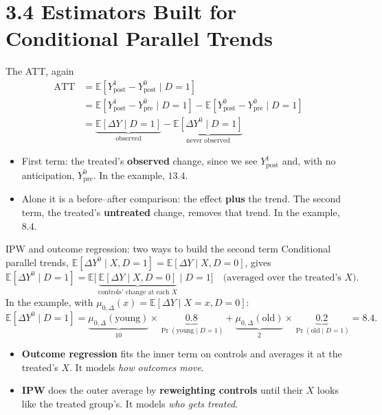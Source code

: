 \documentclass[
  11pt,
  ignorenonframetext,
  aspectratio=169,
]{beamer}
\providecommand{\tightlist}{%
  \setlength{\itemsep}{0pt}\setlength{\parskip}{0pt}}
\begin{document}
\section{3.4 Estimators Built for Conditional Parallel
Trends}\label{estimators-built-for-conditional-parallel-trends}

\begin{frame}{The ATT, again}
\protect{}\label{the-att-again}
\[
\begin{aligned}
\text{ATT} &= \mathbb{E}[Y^1_{\text{post}} - Y^0_{\text{post}} \mid D=1] \\
&= \mathbb{E}[Y^1_{\text{post}} - Y^0_{\text{pre}} \mid D=1] - \mathbb{E}[Y^0_{\text{post}} - Y^0_{\text{pre}} \mid D=1] \\
&= \underbrace{\mathbb{E}[\Delta Y \mid D=1]}_{\text{observed}} - \underbrace{\mathbb{E}[\Delta Y^0 \mid D=1]}_{\text{never observed}}
\end{aligned}
\]

\begin{itemize}
\tightlist
\item
  First term: the treated's \textbf{observed} change, since we see
  \(Y^1_{\text{post}}\) and, with no anticipation, \(Y^0_{\text{pre}}\).
  In the example, \(13.4\).
\item
  Alone it is a before--after comparison: the effect \textbf{plus} the
  trend. The second term, the treated's \textbf{untreated} change,
  removes that trend. In the example, \(8.4\).
\end{itemize}
\end{frame}

\begin{frame}{IPW and outcome regression: two ways to build the second
term}
\protect{}\label{ipw-and-outcome-regression-two-ways-to-build-the-second-term}
Conditional parallel trends,
\(\mathbb{E}[\Delta Y^0 \mid X, D=1] = \mathbb{E}[\Delta Y \mid X, D=0]\),
gives \[
\mathbb{E}[\Delta Y^0 \mid D=1] = \mathbb{E}\big[\, \underbrace{\mathbb{E}[\Delta Y \mid X, D=0]}_{\text{controls' change at each } X} \;\big|\; D=1 \big] \quad \text{(averaged over the treated's } X\text{)}.
\] In the example, with
\(\mu_{0,\Delta}(x) = \mathbb{E}[\Delta Y \mid X = x, D=0]\): \[
\mathbb{E}[\Delta Y^0 \mid D=1] = \underbrace{\mu_{0,\Delta}(\text{young})}_{10} \times \underbrace{0.8}_{\Pr(\text{young} \mid D=1)} + \underbrace{\mu_{0,\Delta}(\text{old})}_{2} \times \underbrace{0.2}_{\Pr(\text{old} \mid D=1)} = 8.4 .
\]

\begin{itemize}
\tightlist
\item
  \textbf{Outcome regression} fits the inner term on controls and
  averages it at the treated's \(X\). It models \emph{how outcomes
  move}.
\item
  \textbf{IPW} does the outer average by \textbf{reweighting controls}
  until their \(X\) looks like the treated group's. It models \emph{who
  gets treated}.
\end{itemize}
\end{frame}
\end{document}

